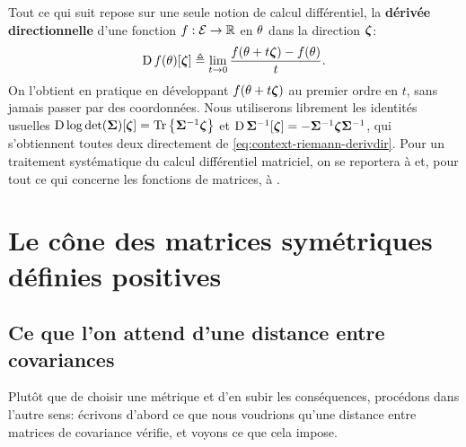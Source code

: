 \begin{remark}
\label{rem:context-riemann-calculdiff}
  Tout ce qui suit repose sur une seule notion de calcul différentiel, la \textbf{dérivée directionnelle} d'une fonction $f:\mathcal{E}\to\mathbb{R}$ en $\theta$ dans la direction $\boldsymbol{\zeta}$:
  \begin{equation}
    \operatorname{\mathrm{D}} f(\theta)[\boldsymbol{\zeta}]
    \triangleq
    \lim_{t\to 0}\frac{f(\theta+t\boldsymbol{\zeta})-f(\theta)}{t}.
    \label{eq:context-riemann-derivdir}
  \end{equation}
  On l'obtient en pratique en développant $f(\theta+t\boldsymbol{\zeta})$ au premier ordre en $t$, sans jamais passer par des coordonnées. Nous utiliserons librement les identités usuelles $\operatorname{\mathrm{D}}\log\operatorname{\operatorname{det}}(\boldsymbol{\Sigma})[\boldsymbol{\zeta}]=\operatorname{\operatorname{Tr}}\left\{{\boldsymbol{\Sigma}}^{-1}\boldsymbol{\zeta}\right\}$ et $\operatorname{\mathrm{D}}{\boldsymbol{\Sigma}}^{-1}[\boldsymbol{\zeta}]=-{\boldsymbol{\Sigma}}^{-1}\boldsymbol{\zeta}{\boldsymbol{\Sigma}}^{-1}$, qui s'obtiennent toutes deux directement de \cref{eq:context-riemann-derivdir}. Pour un traitement systématique du calcul différentiel matriciel, on se reportera à  et, pour tout ce qui concerne les fonctions de matrices, à .
\end{remark}


\section{Le cône des matrices symétriques définies positives}
\label{sec:context-riemann-spd}

\subsection{Ce que l'on attend d'une distance entre covariances}

Plutôt que de choisir une métrique et d'en subir les conséquences, procédons dans l'autre sens: écrivons d'abord ce que nous voudrions qu'une distance entre matrices de covariance vérifie, et voyons ce que cela impose.

